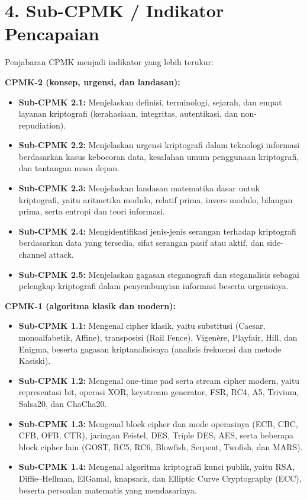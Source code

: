 \documentclass[12pt,a4paper]{article}
\begin{document}
\vspace{0.5cm}

\section*{4. Sub-CPMK / Indikator Pencapaian}

Penjabaran CPMK menjadi indikator yang lebih terukur:

\vspace{0.2cm}
\noindent\textbf{CPMK-2 (konsep, urgensi, dan landasan):}
\begin{itemize}[leftmargin=*]
  \item \textbf{Sub-CPMK 2.1:} Menjelaskan definisi, terminologi, sejarah, dan empat layanan kriptografi (kerahasiaan, integritas, autentikasi, dan non-repudiation).
  \item \textbf{Sub-CPMK 2.2:} Menjelaskan urgensi kriptografi dalam teknologi informasi berdasarkan kasus kebocoran data, kesalahan umum penggunaan kriptografi, dan tantangan masa depan.
  \item \textbf{Sub-CPMK 2.3:} Menjelaskan landasan matematika dasar untuk kriptografi, yaitu aritmetika modulo, relatif prima, invers modulo, bilangan prima, serta entropi dan teori informasi.
  \item \textbf{Sub-CPMK 2.4:} Mengidentifikasi jenis-jenis serangan terhadap kriptografi berdasarkan data yang tersedia, sifat serangan pasif atau aktif, dan side-channel attack.
  \item \textbf{Sub-CPMK 2.5:} Menjelaskan gagasan steganografi dan steganalisis sebagai pelengkap kriptografi dalam penyembunyian informasi beserta urgensinya.
\end{itemize}

\noindent\textbf{CPMK-1 (algoritma klasik dan modern):}
\begin{itemize}[leftmargin=*]
  \item \textbf{Sub-CPMK 1.1:} Mengenal cipher klasik, yaitu substitusi (Caesar, monoalfabetik, Affine), transposisi (Rail Fence), Vigen\`{e}re, Playfair, Hill, dan Enigma, beserta gagasan kriptanalisisnya (analisis frekuensi dan metode Kasiski).
  \item \textbf{Sub-CPMK 1.2:} Mengenal one-time pad serta stream cipher modern, yaitu representasi bit, operasi XOR, keystream generator, FSR, RC4, A5, Trivium, Salsa20, dan ChaCha20.
  \item \textbf{Sub-CPMK 1.3:} Mengenal block cipher dan mode operasinya (ECB, CBC, CFB, OFB, CTR), jaringan Feistel, DES, Triple DES, AES, serta beberapa block cipher lain (GOST, RC5, RC6, Blowfish, Serpent, Twofish, dan MARS).
  \item \textbf{Sub-CPMK 1.4:} Mengenal algoritma kriptografi kunci publik, yaitu RSA, Diffie--Hellman, ElGamal, knapsack, dan Elliptic Curve Cryptography (ECC), beserta persoalan matematis yang mendasarinya.
\end{itemize}
\end{document}
